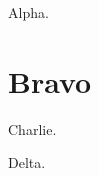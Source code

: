 \documentclass{article}
\begin{document}
\everypar{[ep]}
Alpha.\par
\section{Bravo}
Charlie.\par
Delta.\par
\end{document}

